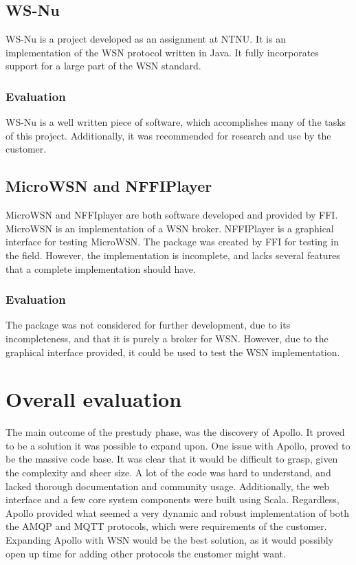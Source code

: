 \subsection{WS-Nu}
\label{subsec:prestudies-existing_solutions-ws_nu}

WS-Nu is a project developed as an assignment at NTNU. It is an implementation of the WSN protocol written in Java. It fully incorporates support for a large part of the WSN standard.

\subsubsection{Evaluation}
\label{subsec:prestudies-existing_solution-ws_nu-evaluation}

WS-Nu is a well written piece of software, which accomplishes many of the tasks of this project. Additionally, it was recommended for research and use by the customer.

\subsection{MicroWSN and NFFIPlayer}
\label{subsec:prestudies-existing_solutions-micro_wsn_and_nffiplayer}

MicroWSN and NFFIplayer are both software developed and provided by FFI. MicroWSN is an implementation of a WSN broker. NFFIPlayer is a graphical interface for testing MicroWSN. The package was created by FFI for testing in the field. However, the implementation is incomplete, and lacks several features that a complete implementation should have.

\subsubsection{Evaluation}
\label{subsec:prestudies-existing_solutions-micro_wsn_and_nffiplayer-evaluation}

The package was not considered for further development, due to its incompleteness, and that it is purely a broker for WSN. However, due to the graphical interface provided, it could be used to test the WSN implementation.

\section{Overall evaluation}
\label{sec:prestudies-overall_evaluation}

The main outcome of the prestudy phase, was the discovery of Apollo. It proved to be a solution it was possible to expand upon. One issue with Apollo, proved to be the massive code base. It was clear that it would be difficult to grasp, given the complexity and sheer size. A lot of the code was hard to understand, and lacked thorough documentation and community usage. Additionally, the web interface and a few core system components were built using Scala. Regardless, Apollo provided what seemed a very dynamic and robust implementation of both the AMQP and MQTT protocols, which were requirements of the customer. Expanding Apollo with WSN would be the best solution, as it would possibly open up time for adding other protocols the customer might want.

